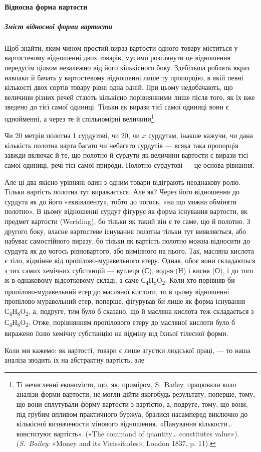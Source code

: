 \paragraph{Відносна форма вартости}

\subparagraph{Зміст відносної форми вартости}

Щоб знайти, яким чином простий вираз вартости одного товару
міститься у вартостевому відношенні двох товарів, мусимо
розглянути це відношення передусім цілком незалежно від його
кількісного боку. Здебільша роблять якраз навпаки й бачать у
вартостевому відношенні лише ту пропорцію, в якій певні кількості
двох сортів товару рівні одна одній. При цьому недобачають,
що величини різних речей стають кількісно порівнянними
лише після того, як їх вже зведено до тієї самої одиниці. Тільки
як вирази тієї самої одиниці вони є однойменні, а через те й спільномірні
величини\footnote{
Ті нечисленні економісти, що, як, приміром, S.~Bailey, працювали
коло аналізи форми вартости, не могли дійти якогобудь результату,
поперше, тому, що вони сплутували форму вартости з вартістю, а, подруге,
тому, що вони, під грубим впливом практичного буржуа, бралися насамперед
виключно до кількісної визначености мінового відношення. «Панування
кількости\dots{} конституює вартість». («The command of quantity\dots{}
constitutes value»). (\emph{S.~Bailey}: «Money and its Vicissitudes», London
1837, p. 11).
}.

Чи 20 метрів полотна \deq{} 1 сурдутові, чи 20, чи $x$ сурдутам,
інакше кажучи, чи дана кількість полотна варта багато чи небагато
сурдутів — всяка така пропорція завжди включає й те, що
полотно й сурдути як величини вартости є вирази тієї самої одиниці,
речі тієї самої природи. Полотно \deq{} сурдутові — це основа
рівнання.

Але ці два якісно урівняні один з одним товари відіграють
неоднакову ролю. Тільки вартість полотна тут виражається. Але
як? Через його відношення до сурдута як до його «еквіваленту»,
тобто до чогось, «на що можна обміняти полотно». В цьому відношенні
сурдут фігурує як форма існування вартости, як предмет
вартости (Wertding), бо тільки як такий він є те саме, що й полотно.
З другого боку, власне вартостеве існування полотна
тільки тут виявляється, або набуває самостійного виразу, бо
тільки як вартість полотно можна відносити до сурдута як до
чогось рівновартого, або вимінного на нього. Так, масляна кислота
є тіло, відмінне від пропілово-муравельного етеру. Однак, обоє
вони складаються з тих самих хемічних субстанцій — вуглеця
(С), водня (Н) і кисня (О), і до того ж в однаковому відсотковому
складі, а саме С\textsubscript{4}Н\textsubscript{8}O\textsubscript{2}.
Коли хто порівняв би пропілово-муравельний
етер до масляної кислоти, то в цьому відношенні пропілово-муравельний
етер, поперше, фігурував би лише як форма
існування С\textsubscript{4}Н\textsubscript{8}O\textsubscript{2},
а, подруге, тим було б сказано, що й масляна
кислота теж складається з С\textsubscript{4}Н\textsubscript{8}O\textsubscript{2}.
Отже, порівнянням пропілового
етеру до масляної кислоти було б виражено їхню хемічну
субстанцію на відміну від їхньої тілесної форми.

Коли ми кажемо: як вартості, товари є лише згустки людської
праці, — то наша аналіза зводить їх на абстрактну вартість, але
\parbreak{}  %
